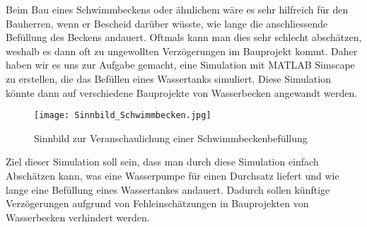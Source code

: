 Beim Bau eines Schwimmbeckens oder ähnlichem wäre es sehr hilfreich für den 	Bauherren, wenn er Bescheid darüber wüsste, wie lange die anschliessende 		Befüllung des Beckens andauert. Oftmals kann man dies sehr schlecht 			abschätzen, weshalb es dann oft zu ungewollten Verzögerungen im 				Bauprojekt kommt. Daher haben wir es uns zur Aufgabe gemacht, eine 				Simulation mit MATLAB Simscape zu erstellen, die das Befüllen eines 			Wassertanks simuliert. Diese Simulation könnte dann auf verschiedene 			Bauprojekte von Wasserbecken angewandt werden.

\begin{figure}[htb]
\texttt{[image: Sinnbild\_Schwimmbecken.jpg]}
\caption{Sinnbild zur Veranschaulichung einer Schwimmbeckenbefüllung}
\label{fig:Sinnbild zur Veranschaulichung einer Schwimmbeckenbefüllung}
\end{figure}

Ziel dieser Simulation soll sein, dass man durch diese Simulation einfach Abschätzen kann, was eine Wasserpumpe für einen Durchsatz liefert und wie lange eine Befüllung eines Wassertankes andauert. Dadurch sollen künftige Verzögerungen aufgrund von Fehleinschätzungen in Bauprojekten von 				Wasserbecken verhindert werden.